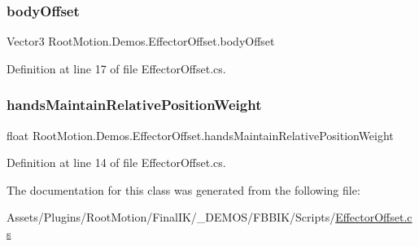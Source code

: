 \subsubsection{\texorpdfstring{body\+Offset}{bodyOffset}}
{\footnotesize\ttfamily Vector3 Root\+Motion.\+Demos.\+Effector\+Offset.\+body\+Offset}



Definition at line 17 of file Effector\+Offset.\+cs.

\mbox{\label{class_root_motion_1_1_demos_1_1_effector_offset_afce73939f42499be4f5944312822d560}} 
\subsubsection{\texorpdfstring{hands\+Maintain\+Relative\+Position\+Weight}{handsMaintainRelativePositionWeight}}
{\footnotesize\ttfamily float Root\+Motion.\+Demos.\+Effector\+Offset.\+hands\+Maintain\+Relative\+Position\+Weight}



Definition at line 14 of file Effector\+Offset.\+cs.



The documentation for this class was generated from the following file\+:\begin{DoxyCompactItemize}
\item 
Assets/\+Plugins/\+Root\+Motion/\+Final\+I\+K/\+\_\+\+D\+E\+M\+O\+S/\+F\+B\+B\+I\+K/\+Scripts/\mbox{\hyperlink{_effector_offset_8cs}{Effector\+Offset.\+cs}}\end{DoxyCompactItemize}
